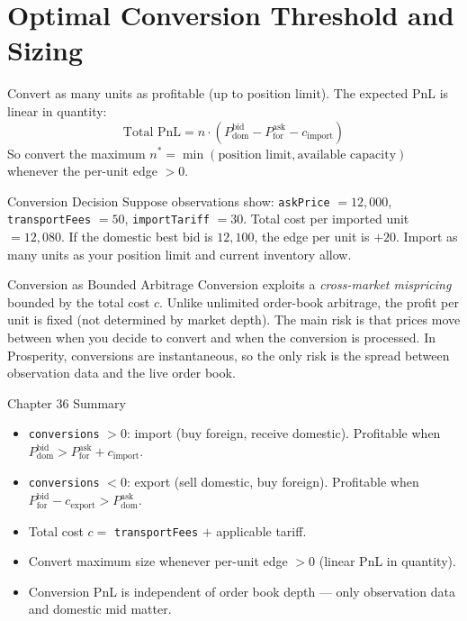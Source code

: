 \documentclass[12pt,a4paper,openany]{report}
\theoremstyle{definition}
\begin{document}
\section{Optimal Conversion Threshold and Sizing}

Convert as many units as profitable (up to position limit). The expected PnL is linear in quantity:
\[
  \text{Total PnL} = n \cdot \left(P_{\text{dom}}^{\text{bid}} - P_{\text{for}}^{\text{ask}} - c_{\text{import}}\right)
\]
So convert the maximum $n^* = \min(\text{position limit}, \text{available capacity})$ whenever the per-unit edge $> 0$.

\begin{examplebox}{Conversion Decision}
Suppose observations show: \texttt{askPrice} $= 12{,}000$, \texttt{transportFees} $= 50$, \texttt{importTariff} $= 30$. Total cost per imported unit $= 12{,}080$. If the domestic best bid is $12{,}100$, the edge per unit is $+20$. Import as many units as your position limit and current inventory allow.
\end{examplebox}

\begin{keyconceptbox}{Conversion as Bounded Arbitrage}
Conversion exploits a \emph{cross-market mispricing} bounded by the total cost $c$. Unlike unlimited order-book arbitrage, the profit per unit is fixed (not determined by market depth). The main risk is that prices move between when you decide to convert and when the conversion is processed. In Prosperity, conversions are instantaneous, so the only risk is the spread between observation data and the live order book.
\end{keyconceptbox}

\begin{takeawaybox}{Chapter 36 Summary}
\begin{itemize}
  \item \texttt{conversions} $> 0$: import (buy foreign, receive domestic). Profitable when $P_{\text{dom}}^{\text{bid}} > P_{\text{for}}^{\text{ask}} + c_{\text{import}}$.
  \item \texttt{conversions} $< 0$: export (sell domestic, buy foreign). Profitable when $P_{\text{for}}^{\text{bid}} - c_{\text{export}} > P_{\text{dom}}^{\text{ask}}$.
  \item Total cost $c =$ \texttt{transportFees} $+$ applicable tariff.
  \item Convert maximum size whenever per-unit edge $> 0$ (linear PnL in quantity).
  \item Conversion PnL is independent of order book depth — only observation data and domestic mid matter.
\end{itemize}
\end{takeawaybox}
\end{document}
